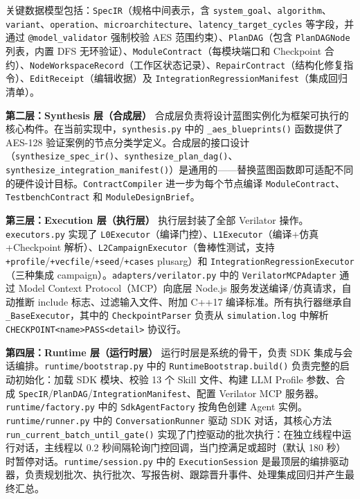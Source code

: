 关键数据模型包括：\texttt{SpecIR}（规格中间表示，含
\texttt{system\_goal}、\texttt{algorithm}、\texttt{variant}、\texttt{operation}、\texttt{microarchitecture}、\texttt{latency\_target\_cycles}
等字段，并通过 \texttt{@model\_validator} 强制校验 AES
范围约束）、\texttt{PlanDAG}（包含 \texttt{PlanDAGNode} 列表，内置 DFS
无环验证）、\texttt{ModuleContract}（每模块端口和 Checkpoint
合约）、\texttt{NodeWorkspaceRecord}（工作区状态记录）、\texttt{RepairContract}（结构化修复指令）、\texttt{EditReceipt}（编辑收据）及
\texttt{IntegrationRegressionManifest}（集成回归清单）。

\textbf{第二层：Synthesis 层（合成层）}
合成层负责将设计蓝图实例化为框架可执行的核心构件。在当前实现中，\texttt{synthesis.py}
中的 \texttt{\_aes\_blueprints()} 函数提供了 AES-128
验证案例的节点分类学定义。合成层的接口设计（\texttt{synthesize\_spec\_ir()}、\texttt{synthesize\_plan\_dag()}、\texttt{synthesize\_integration\_manifest()}）是通用的------替换蓝图函数即可适配不同的硬件设计目标。\texttt{ContractCompiler}
进一步为每个节点编译 \texttt{ModuleContract}、\texttt{TestbenchContract}
和 \texttt{ModuleDesignBrief}。

\textbf{第三层：Execution 层（执行层）} 执行层封装了全部 Verilator
操作。\texttt{executors.py} 实现了
\texttt{L0Executor}（编译门控）、\texttt{L1Executor}（编译+仿真+Checkpoint
解析）、\texttt{L2CampaignExecutor}（鲁棒性测试，支持
\texttt{+profile}/\texttt{+vecfile}/\texttt{+seed}/\texttt{+cases}
plusarg）和 \texttt{IntegrationRegressionExecutor}（三种集成
campaign）。\texttt{adapters/verilator.py} 中的
\texttt{VerilatorMCPAdapter} 通过 Model Context Protocol（MCP）向底层
Node.js 服务发送编译/仿真请求，自动推断 include 标志、过滤输入文件、附加
C++17 编译标准。所有执行器继承自 \texttt{\_BaseExecutor}，其中的
\texttt{CheckpointParser} 负责从 \texttt{simulation.log} 中解析
\texttt{CHECKPOINT\textbar{}\textless{}name\textgreater{}\textbar{}PASS\textbar{}\textless{}detail\textgreater{}}
协议行。

\textbf{第四层：Runtime 层（运行时层）} 运行时层是系统的骨干，负责 SDK
集成与会话编排。\texttt{runtime/bootstrap.py} 中的
\texttt{RuntimeBootstrap.build()} 负责完整的启动初始化：加载 SDK
模块、校验 13 个 Skill 文件、构建 LLM Profile 参数、合成
\texttt{SpecIR}/\texttt{PlanDAG}/\texttt{IntegrationManifest}、配置
Verilator MCP 服务器。\texttt{runtime/factory.py} 中的
\texttt{SdkAgentFactory} 按角色创建 Agent
实例。\texttt{runtime/runner.py} 中的 \texttt{ConversationRunner} 驱动
SDK 对话，其核心方法 \texttt{run\_current\_batch\_until\_gate()}
实现了门控驱动的批次执行：在独立线程中运行对话，主线程以 0.2
秒间隔轮询门控回调，当门控满足或超时（默认 180
秒）时暂停对话。\texttt{runtime/session.py} 中的
\texttt{ExecutionSession}
是最顶层的编排驱动器，负责规划批次、执行批次、写报告树、跟踪晋升事件、处理集成回归并产生最终汇总。

